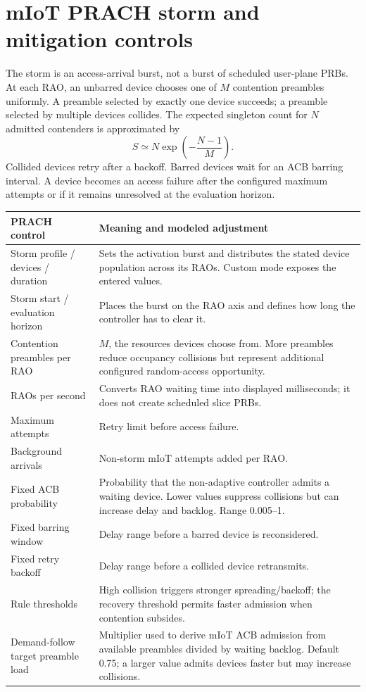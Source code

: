 \documentclass[10pt]{article}
\begin{document}
\section{mIoT PRACH storm and mitigation controls}
The storm is an access-arrival burst, not a burst of scheduled user-plane PRBs. At each RAO, an unbarred device chooses one of $M$ contention preambles uniformly. A preamble selected by exactly one device succeeds; a preamble selected by multiple devices collides. The expected singleton count for $N$ admitted contenders is approximated by
\[
S\simeq N\exp\!\left(-\frac{N-1}{M}\right).
\]
Collided devices retry after a backoff. Barred devices wait for an ACB barring interval. A device becomes an access failure after the configured maximum attempts or if it remains unresolved at the evaluation horizon.

\begin{tabular}{>{\raggedright\arraybackslash}p{}>{\raggedright\arraybackslash}p{}}
\toprule
PRACH control & Meaning and modeled adjustment\\
\midrule
Storm profile / devices / duration & Sets the activation burst and distributes the stated device population across its RAOs. Custom mode exposes the entered values.\\
Storm start / evaluation horizon & Places the burst on the RAO axis and defines how long the controller has to clear it.\\
Contention preambles per RAO & $M$, the resources devices choose from. More preambles reduce occupancy collisions but represent additional configured random-access opportunity.\\
RAOs per second & Converts RAO waiting time into displayed milliseconds; it does not create scheduled slice PRBs.\\
Maximum attempts & Retry limit before access failure.\\
Background arrivals & Non-storm mIoT attempts added per RAO.\\
Fixed ACB probability & Probability that the non-adaptive controller admits a waiting device. Lower values suppress collisions but can increase delay and backlog. Range 0.005--1.\\
Fixed barring window & Delay range before a barred device is reconsidered.\\
Fixed retry backoff & Delay range before a collided device retransmits.\\
Rule thresholds & High collision triggers stronger spreading/backoff; the recovery threshold permits faster admission when contention subsides.\\
Demand-follow target preamble load & Multiplier used to derive mIoT ACB admission from available preambles divided by waiting backlog. Default 0.75; a larger value admits devices faster but may increase collisions.\\
\bottomrule
\end{tabular}
\end{document}
